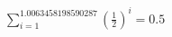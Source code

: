 \documentclass[preview]{standalone}
\begin{document}
\begin{align*}
\sum_{i=1}^{1.0063458198590287} (\frac{1}{2})^i = {0.5}
\end{align*}
\end{document}
